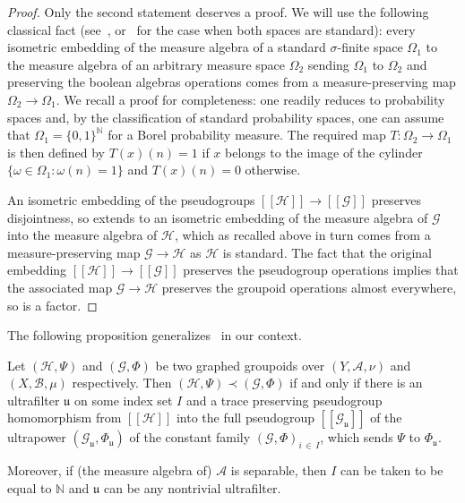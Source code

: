 \documentclass[AHL,Unicode,longabstracts,published]{cedram}
\newcommand{\Nmath}{\mathbb{N}}
\newcommand{\cH}{\mathcal{H}}
\newcommand{\ch}{\mathcal{H}}
\newcommand{\cg}{\mathcal{G}}
\newcommand{\ra}{\mathscr{A}}
\newcommand{\rb}{\mathscr{B}}
\newcommand{\ul}{\mathfrak{u}}
\begin{document}
\begin{proof}
Only the second statement deserves a proof. We will use the following classical fact (see~\cite[Theorem~343B]{fremlin2011measure}, or~\cite{vonNeumann32} for the case when both spaces are standard): every isometric embedding of the measure algebra of a standard $\sigma$-finite space $\Omega_1$ to the measure algebra of an arbitrary measure space $\Omega_2$ sending $\Omega_1$ to $\Omega_2$ and preserving the boolean algebras operations comes from a measure-preserving map $\Omega_2 \to \Omega_1$. We recall a proof for completeness: one readily reduces to probability spaces and, by the classification of standard probability spaces, one can assume that $\Omega_1=\{0,1\}^\Nmath$ for a Borel probability measure. The required map $T \colon \Omega_2 \to \Omega_1$ is then defined by $T(x)(n)=1$ if $x$ belongs to the image of the cylinder $\{\omega \in \Omega_1: \omega(n)=1\}$ and $T(x)(n)=0$ otherwise.

An isometric embedding of the pseudogroups $[[\cH]] \to [[\cg]]$ preserves disjointness, so extends to an isometric embedding of the measure algebra of $\cg$ into the measure algebra of $\ch$, which as recalled above in turn comes from a measure-preserving map $\cg \to \ch$ as $\ch$ is standard. The fact that the original embedding $[[\cH]] \to [[\cg]]$ preserves the pseudogroup operations implies that the associated map $\cg \to \ch$ preserves the groupoid operations almost everywhere, so is a factor.
\end{proof}

The following proposition generalizes~\cite[Theorem~1]{CKTD} in our context.

\begin{prop}\label{prop:relation_weakequivalence_factor}
Let $(\cH,\Psi)$ and $(\cg, \Phi)$ be two graphed groupoids over $(Y,\ra, \nu)$ and $(X, \rb, \mu)$ respectively. Then $(\cH,\Psi) \prec (\cg, \Phi)$ if and only if there is an ultrafilter $\ul$ on some index set $I$ and a trace preserving pseudogroup homomorphism from $[[\ch]]$ into the full pseudogroup $[[\cg_\ul]]$ of the ultrapower $(\cg_\ul, \Phi_\ul)$ of the constant family $(\cg, \Phi)_{i\,\in\,I}$, which sends $\Psi$ to $\Phi_\ul$.



Moreover, if (the measure algebra of) $\ra$ is separable, then $I$ can be taken to be equal to $\Nmath$ and $\ul$ can be any nontrivial ultrafilter.
\end{prop}
\end{document}
